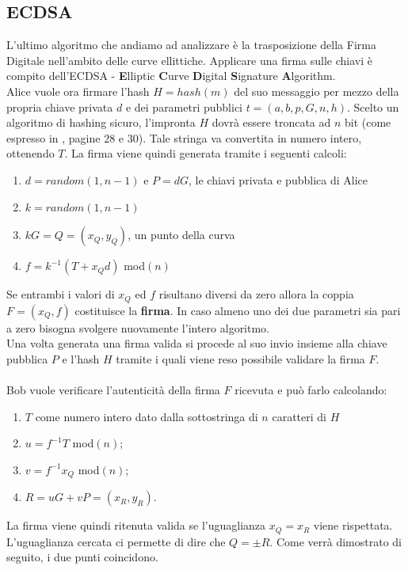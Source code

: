 \documentclass[a4paper,12pt]{tesiinfo}
\begin{document}
\subsection{ECDSA}
L'ultimo algoritmo che andiamo ad analizzare \`e la trasposizione della Firma Digitale nell'ambito delle curve ellittiche. Applicare una firma sulle chiavi \`e compito dell'ECDSA - \textbf{E}lliptic \textbf{C}urve \textbf{D}igital \textbf{S}ignature \textbf{A}lgorithm.
\\
Alice vuole ora firmare l'hash $H=hash(m)$ del suo messaggio per mezzo della propria chiave privata $d$ e dei parametri pubblici $t = (a, b, p, G, n, h)$.
Scelto un algoritmo di hashing sicuro, l'impronta $H$ dovr\`a essere troncata ad $n$ bit (come espresso in \cite{dss}, pagine 28 e 30). Tale stringa va convertita in numero intero, ottenendo $T$. La firma viene quindi generata tramite i seguenti calcoli:
\begin{enumerate}
 \item $d = random(1, n-1)$ e $P =dG$, le chiavi privata e pubblica di Alice 
 \item $k = random(1, n-1)$
 \item $kG=Q= (x_Q, y_Q) $, un punto della curva
 \item $f = k^{-1} (T+x_Qd) $ mod$(n)$
\end{enumerate}
Se entrambi i valori di $x_Q$ ed $f$ risultano diversi da zero allora la coppia $F = (x_Q, f)$ costituisce la \textbf{firma}. In caso almeno uno dei due parametri sia pari a zero bisogna svolgere nuovamente l'intero algoritmo.
\\
Una volta generata una firma valida si procede al suo invio insieme alla chiave pubblica $P$ e l'hash $H$ tramite i quali viene reso possibile validare la firma $F$.
\\
\\
Bob vuole verificare l'autenticit\`a della firma $F$ ricevuta e pu\`o farlo calcolando:
\begin{enumerate}
 \item $T$ come numero intero dato dalla sottostringa di $n$ caratteri di $H$
 \item $u = f^{-1}T$ mod$(n)$;
 \item $v = f^{-1}x_Q$ mod$(n)$;
 \item $R = uG + vP = (x_R, y_R)$.
\end{enumerate}
La firma viene quindi ritenuta valida se l'uguaglianza $x_Q = x_R $ viene rispettata. L'uguaglianza cercata ci permette di dire che $Q = \pm R$. Come verr\`a dimostrato di seguito, i due punti coincidono.
\end{document}
